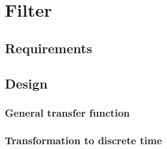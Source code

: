 \chapter{Filter}

\section{Requirements}



\section{Design}

\subsection{General transfer function}

\subsection{Transformation to discrete time}

